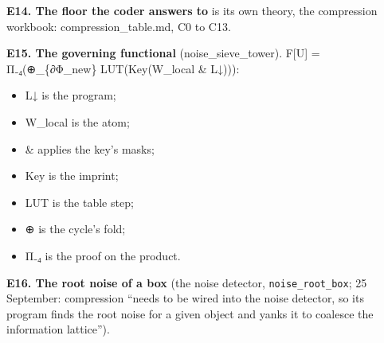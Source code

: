 \textbf{E14. The floor the coder answers to} is its own theory, the compression workbook: compression\_\allowbreak{}table.md, C0 to C13.

\textbf{E15. The governing functional} (noise\_\allowbreak{}sieve\_\allowbreak{}tower). F[U] = Π₋₄(⊕\_\allowbreak{}\{∂Φ\_\allowbreak{}new\} LUT(Key(W\_\allowbreak{}local \& L↓))):

\begin{itemize}
\item L↓ is the program;
\item W\_\allowbreak{}local is the atom;
\item \& applies the key's masks;
\item Key is the imprint;
\item LUT is the table step;
\item ⊕ is the cycle's fold;
\item Π₋₄ is the proof on the product.
\end{itemize}

\textbf{E16. The root noise of a box} (the noise detector, \texttt{noise\_\allowbreak{}root\_\allowbreak{}box}; 25 September: compression “needs to be wired into the noise detector, so its program finds the root noise for a given object and yanks it to coalesce the information lattice”).

